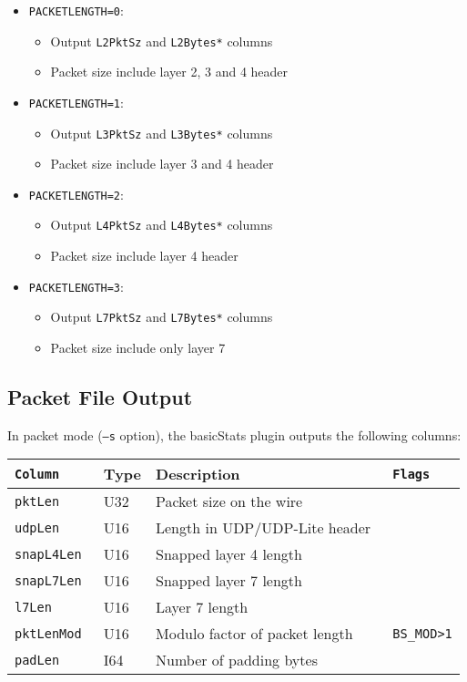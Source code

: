 \documentclass[documentation]{subfiles}
\begin{document}
\begin{itemize}
    \item {\tt PACKETLENGTH=0}:
        \begin{itemize}
            \item Output {\tt *L2PktSz} and {\tt *L2Bytes*} columns
            \item Packet size include layer 2, 3 and 4 header
        \end{itemize}
    \item {\tt PACKETLENGTH=1}:
        \begin{itemize}
            \item Output {\tt *L3PktSz} and {\tt *L3Bytes*} columns
            \item Packet size include layer 3 and 4 header
        \end{itemize}
    \item {\tt PACKETLENGTH=2}:
        \begin{itemize}
            \item Output {\tt *L4PktSz} and {\tt *L4Bytes*} columns
            \item Packet size include layer 4 header
        \end{itemize}
    \item {\tt PACKETLENGTH=3}:
        \begin{itemize}
            \item Output {\tt *L7PktSz} and {\tt *L7Bytes*} columns
            \item Packet size include only layer 7
        \end{itemize}
\end{itemize}

\subsection{Packet File Output}
In packet mode ({\tt --s} option), the basicStats plugin outputs the following columns:
\begin{longtable}{>{\tt}lll>{\tt\small}l}
    \toprule
    {\bf Column} & {\bf Type} & {\bf Description}              & {\bf Flags}\\
    \midrule\endhead%
    pktLen       & U32        & Packet size on the wire        & \\
    udpLen       & U16        & Length in UDP/UDP-Lite header  & \\
    snapL4Len    & U16        & Snapped layer 4 length         & \\
    snapL7Len    & U16        & Snapped layer 7 length         & \\
    l7Len        & U16        & Layer 7 length                 & \\
    pktLenMod    & U16        & Modulo factor of packet length & BS\_MOD>1\\
    padLen       & I64        & Number of padding bytes        & \\
    \bottomrule
\end{longtable}
\end{document}
